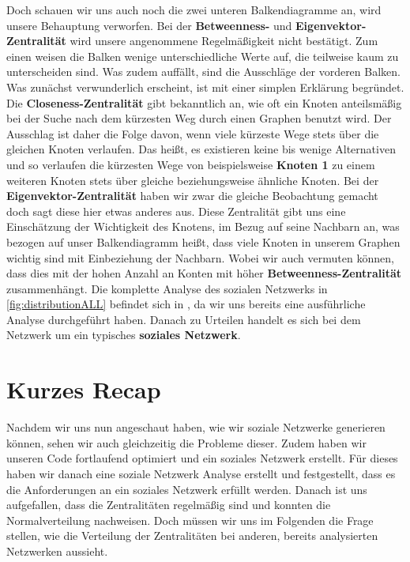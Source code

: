 Doch schauen wir uns auch noch die zwei unteren Balkendiagramme an, wird unsere Behauptung verworfen. Bei der \textbf{Betweenness-} und \textbf{Eigenvektor-Zentralität} wird unsere angenommene Regelmäßigkeit nicht bestätigt. Zum einen weisen die Balken wenige unterschiedliche Werte auf, die teilweise kaum zu unterscheiden sind. Was zudem auffällt, sind die Ausschläge der vorderen Balken. Was zunächst verwunderlich erscheint, ist mit einer simplen Erklärung begründet. Die \textbf{Closeness-Zentralität} gibt bekanntlich an, wie oft ein Knoten anteilsmäßig bei der Suche nach dem kürzesten Weg durch einen Graphen benutzt wird. Der Ausschlag ist daher die Folge davon, wenn viele kürzeste Wege stets über die gleichen Knoten verlaufen. Das heißt, es existieren keine bis wenige Alternativen und so verlaufen die kürzesten Wege von beispielsweise \textbf{Knoten 1} zu einem weiteren Knoten stets über gleiche beziehungsweise ähnliche Knoten. Bei der \textbf{Eigenvektor-Zentralität} haben wir zwar die gleiche Beobachtung gemacht doch sagt diese hier etwas anderes aus. Diese Zentralität gibt uns eine Einschätzung der Wichtigkeit des Knotens, im Bezug auf seine Nachbarn an, was bezogen auf unser Balkendiagramm heißt, dass viele Knoten in unserem Graphen wichtig sind mit Einbeziehung der Nachbarn. Wobei wir auch vermuten können, dass dies mit der hohen Anzahl an Konten mit höher \textbf{Betweenness-Zentralität} zusammenhängt. 
Die komplette Analyse des sozialen Netzwerks in \ref{fig:distributionALL} befindet sich in \cite{TZ}, da wir uns bereits eine ausführliche Analyse durchgeführt haben. Danach zu Urteilen handelt es sich bei dem Netzwerk um ein typisches \textbf{soziales Netzwerk}.

\section{Kurzes Recap}
Nachdem wir uns nun angeschaut haben, wie wir soziale Netzwerke generieren können, sehen wir auch gleichzeitig die Probleme dieser. Zudem haben wir unseren Code fortlaufend optimiert und ein soziales Netzwerk erstellt. Für dieses haben wir danach eine soziale Netzwerk Analyse erstellt und festgestellt, dass es die Anforderungen an ein soziales Netzwerk erfüllt werden. Danach ist uns aufgefallen, dass die Zentralitäten regelmäßig sind und konnten die Normalverteilung nachweisen. Doch müssen wir uns im Folgenden die Frage stellen, wie die Verteilung der Zentralitäten bei anderen, bereits analysierten Netzwerken aussieht.
